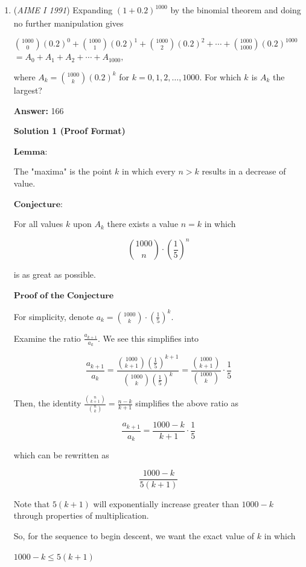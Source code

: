 \begin{enumerate}
	\item (\textit{AIME I 1991}) Expanding $(1+0.2)^{1000}_{}$ by the binomial theorem and doing no further manipulation gives


 ${1000 \choose 0}(0.2)^0+{1000 \choose 1}(0.2)^1+{1000 \choose 2}(0.2)^2+\cdots+{1000 \choose 1000}(0.2)^{1000}$
$= A_0 + A_1 + A_2 + \cdots + A_{1000},$

 where $A_k = {1000 \choose k}(0.2)^k$ for $k = 0,1,2,\ldots,1000$. For which $k_{}^{}$ is $A_k^{}$ the largest?


 
 \textbf{Answer: }166



\textbf{Solution 1 (Proof Format)}

$\textbf{Lemma:}$

 The "maxima" is the point \( k \) in which every \( n > k \) results in a decrease of value.

 $\textbf{Conjecture:}$

 For all values \( k \) upon \( A_k \) there exists a value \( n=k \) in which 

 
 \[\binom{1000}{n} \cdot \left(\frac{1}{5}\right)^n\]

 is as great as possible.

 $\textbf{Proof of the Conjecture}$

 For simplicity, denote $a_k = \binom{1000}{k} \cdot \left(\frac{1}{5}\right)^k$.

 Examine the ratio $\frac{a_{k+1}}{a_k}$. We see this simplifies into 

 
 \[\frac{a_{k+1}}{a_k} =  \frac{\binom{1000}{k+1}\left(\frac{1}{5}\right)^{k+1}}{\binom{1000}{k}\left(\frac{1}{5}\right)^k} = \frac{\binom{1000}{k+1}}{\binom{1000}{k}} \cdot \frac{1}{5}\]

 Then, the identity $\frac{\binom{n}{k+1}}{\binom{n}{k}} = \frac{n-k}{k+1}$ simplifies the above ratio as

 
 \[\frac{a_{k+1}}{a_k} = \frac{1000-k}{k+1} \cdot \frac{1}{5}\]

 which can be rewritten as

 
 \[\frac{1000-k}{5(k+1)}\]

 Note that \( 5(k+1) \) will exponentially increase greater than \( 1000-k \) through properties of multiplication.

 So, for the sequence to begin descent, we want the exact value of \( k \) in which

 \( 1000-k \le 5(k+1) \)


\end{enumerate}
